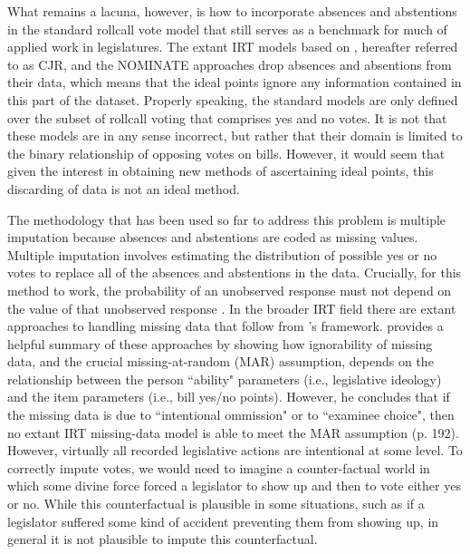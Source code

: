 	What remains a lacuna, however, is how to incorporate absences and abstentions in the standard rollcall vote model that still serves as a benchmark for much of applied work in legislatures. The extant IRT models based on \textcite{jackman2015,jackman2004}, hereafter referred to as CJR, and the NOMINATE approaches \parencite{poole2008} drop absences and absentions from their data, which means that the ideal points ignore any information contained in this part of the dataset. Properly speaking, the standard models are only defined over the subset of rollcall voting that comprises yes and no votes. It is not that these models are in any sense incorrect, but rather that their domain is limited to the binary relationship of opposing votes on bills. However, it would seem that given the interest in obtaining new methods of ascertaining ideal points, this discarding of data is not an ideal method.
	
	
The methodology that has been used so far to address this problem is multiple imputation because absences and abstentions are coded as missing values. Multiple imputation involves estimating the distribution of possible yes or no votes to replace all of the absences and abstentions in the data. Crucially, for this method to work, the probability of an unobserved response must not depend on the value of that unobserved response \parencite{rubin2002}. 	In the broader IRT field there are extant approaches to handling missing data that follow from \textcite{rubin2002}'s framework. \textcite{mislevy2016} provides a helpful summary of these approaches by showing how ignorability of missing data, and the crucial missing-at-random (MAR) assumption, depends on the relationship between the person ``ability" parameters (i.e., legislative ideology) and the item parameters (i.e., bill yes/no points). However, he concludes that if the missing data is due to ``intentional ommission" or to ``examinee choice", then no extant IRT missing-data model is able to meet the MAR assumption (p. 192). However, virtually all recorded legislative actions are intentional at some level. To correctly impute votes, we would need to imagine a counter-factual world in which some divine force forced a legislator to show up and then to vote either yes or no. While this counterfactual is plausible in some situations, such as if a legislator suffered some kind of accident preventing them from showing up, in general it is not plausible to impute this counterfactual.
	
